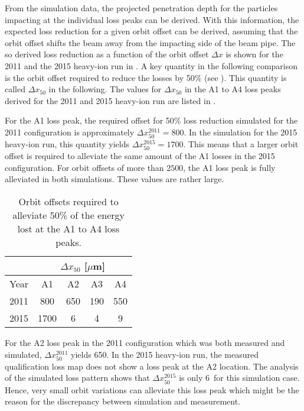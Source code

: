 \newpage
From the simulation data, the projected penetration depth for the particles impacting at the individual loss peaks can be derived. With this information, the expected loss reduction for a given orbit offset can be derived, assuming that the orbit offset shifts the beam away from the impacting side of the beam pipe. The so derived loss reduction as a function of the orbit offset $\Delta x$ is shown for the 2011 and the 2015 heavy-ion run in . A key quantity in the following comparison is the orbit offset required to reduce the losses by 50\% (see ). This quantity is called $\Delta x_{50}$ in the following. The values for $\Delta x_{50}$ in the A1 to A4 loss peaks derived for the 2011 and 2015 heavy-ion run are listed in .



For the A1 loss peak, the required offset for 50\% loss reduction simulated for the 2011 configuration is approximately $\Delta x_{50}^{2011}=800$\mum. In the simulation for the 2015 heavy-ion run, this quantity yields $\Delta x_{50}^{2015}=1700$\mum. This means that a larger orbit offset is required to alleviate the same amount of the A1 losses in the 2015 configuration. For orbit offsets of more than $2500$\mum, the A1 loss peak is fully alleviated in both simulations. These values are rather large. 





\begin{table}[t]
\centering
\caption{Orbit offsets required to alleviate 50\% of the energy lost at the A1 to A4 loss peaks.}
\label{tab:offsetdx}
\begin{tabular}{lcccc}
\toprule
     & \multicolumn{4}{c}{$\Delta x_{50}$ {[}$\mu$m{]}} \\ \midrule
Year & A1          & A2         & A3        & A4        \\ \midrule
2011 & 800         & 650        & 190       & 550       \\
2015 & 1700        & 6          & 4         & 9         \\ \bottomrule
\end{tabular}
\end{table}

\newpage

For the A2 loss peak in the 2011 configuration which was both measured and simulated, $\Delta x_{50}^{2011}$ yields 650\mum. In the 2015 heavy-ion run, the measured qualification loss map does not show a loss peak at the A2 location. The analysis of the simulated loss pattern shows that $\Delta x_{50}^{2015}$ is only 6\mum\, for this simulation case. Hence, very small orbit variations can alleviate this loss peak which might be the reason for the discrepancy between simulation and measurement.

